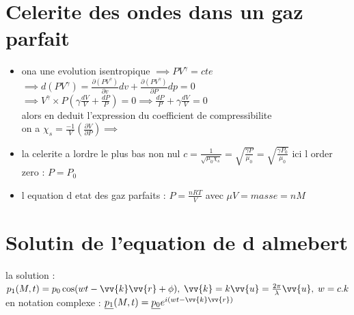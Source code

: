 \documentclass[12pt]{book}
\newcommand{\x}{\chi}
\begin{document}
        \section{Celerite des ondes dans un gaz parfait }
            \begin{itemize}
                \item ona une evolution isentropique $\implies PV^\gamma = cte$\\
                    $\implies d(PV^\gamma) =\frac{\partial (PV^\gamma)}{\partial v}dv + \frac{\partial (PV^\gamma)}{\partial P}dp =0 $  \\
                    $\implies V^\gamma \times P (\gamma\frac{dV}{V}+\frac{dP}{P}) = 0 \implies \frac{dP}{P} + \gamma\frac{dV}{V}=0$ \\
                    alors en deduit l'expression du coefficient de compressibilite \\
                     on a $\x_s=\frac{-1}{V}\left( \frac{\partial V}{\partial P}\right) \implies$  \boxed{\x_s=\frac{1}{\gamma P} }
                \item la celerite a lordre le plus bas non nul $c = \frac{1}{\sqrt{\mu_0\x_s}} =\sqrt{\frac{\gamma P}{\mu_0}}=\sqrt{\frac{\gamma P_0}{\mu_0}}$ ici l order zero : $P=P_0$
                \item l equation d etat des gaz parfaits : $P = \frac{nRT}{V}$ avec $\mu V = masse = nM$
            \end{itemize}
            \begin{center}
            \end{center}
        \section{Solutin de l'equation de d almebert}
            la solution : \\
                $p_1(M,t) = p_0\cos(wt-\vv{k}\vv{r}+\phi) , \; \vv{k} = k\vv{u}=\frac{2\pi}{\lambda}\vv{u} , \; w=c.k $ \\
            en notation complexe :
                $\underline{p_1} (M,t)= \underline{p_0}e^{i(wt-\vv{k}\vv{r})}$
\end{document}
